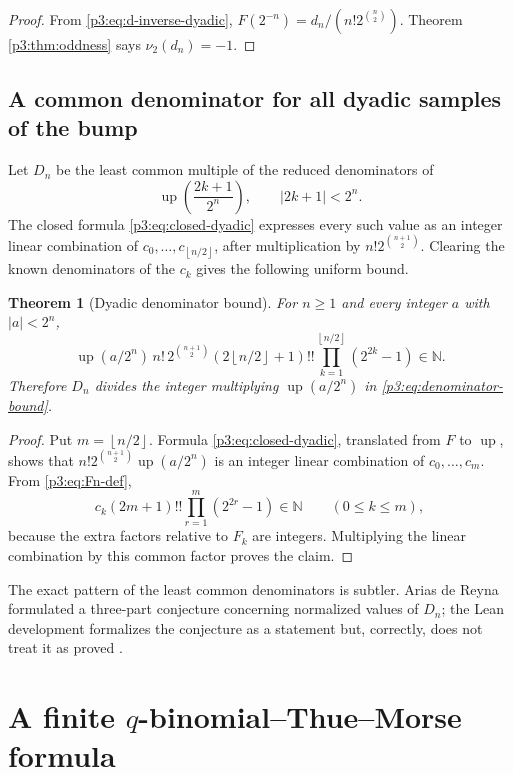 \documentclass[11pt]{article}
\numberwithin{equation}{section}
\newtheorem{theorem}{Theorem}[section]
\theoremstyle{definition}
\theoremstyle{remark}
\newcommand{\N}{\mathbb N}
\newcommand{\upf}{\operatorname{up}}
\newcommand{\floor}[1]{\left\lfloor#1\right\rfloor}
\begin{document}
\begin{proof}
From \eqref{p3:eq:d-inverse-dyadic},
$F(2^{-n})=d_n/(n!2^{\binom n2})$.  Theorem \ref{p3:thm:oddness} says $\nu_2(d_n)=-1$.
\end{proof}

\subsection{A common denominator for all dyadic samples of the bump}

Let $D_n$ be the least common multiple of the reduced denominators of
\[
 \upf\!\left(\frac{2k+1}{2^n}\right),
 \qquad |2k+1|<2^n.
\]
The closed formula \eqref{p3:eq:closed-dyadic} expresses every such value as an integer linear combination of $c_0,\ldots,c_{\floor{n/2}}$, after multiplication by $n!2^{\binom{n+1}{2}}$.  Clearing the known denominators of the $c_k$ gives the following uniform bound.

\begin{theorem}[Dyadic denominator bound]\label{p3:thm:denominator-bound}
For $n\ge1$ and every integer $a$ with $|a|<2^n$,
\begin{equation}\label{p3:eq:denominator-bound}
 \upf(a/2^n)\,n!\,2^{\binom{n+1}{2}}
 (2\floor{n/2}+1)!!
 \prod_{k=1}^{\floor{n/2}}(2^{2k}-1)
 \in\N.
\end{equation}
Therefore $D_n$ divides the integer multiplying $\upf(a/2^n)$ in \eqref{p3:eq:denominator-bound}.
\end{theorem}

\begin{proof}
Put $m=\floor{n/2}$.  Formula \eqref{p3:eq:closed-dyadic}, translated from $F$ to $\upf$, shows that
$n!2^{\binom{n+1}{2}}\upf(a/2^n)$ is an integer linear combination of $c_0,\ldots,c_m$.  From \eqref{p3:eq:Fn-def},
\[
 c_k(2m+1)!!\prod_{r=1}^{m}(2^{2r}-1)\in\N
 \qquad(0\le k\le m),
\]
because the extra factors relative to $F_k$ are integers.  Multiplying the linear combination by this common factor proves the claim.
\end{proof}

The exact pattern of the least common denominators is subtler.  Arias de Reyna formulated a three-part conjecture concerning normalized values of $D_n$; the Lean development formalizes the conjecture as a statement but, correctly, does not treat it as proved \cite{p3:Arias06487,p3:ProveIt}.

\section{A finite $q$-binomial--Thue--Morse formula}\label{p3:sec:qbinomial}
\end{document}
